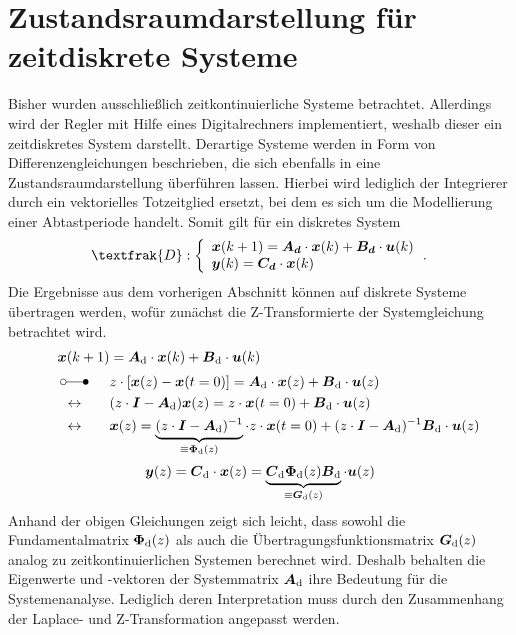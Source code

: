 \section{Zustandsraumdarstellung für zeitdiskrete Systeme}
Bisher wurden ausschließlich zeitkontinuierliche Systeme betrachtet. Allerdings wird der Regler mit Hilfe eines Digitalrechners implementiert, weshalb dieser ein zeitdiskretes System darstellt.  Derartige Systeme werden in Form von Differenzengleichungen beschrieben, die sich ebenfalls in eine Zustandsraumdarstellung überführen lassen. Hierbei wird lediglich der Integrierer durch ein vektorielles Totzeitglied ersetzt, bei dem es sich um die Modellierung einer Abtastperiode handelt.  Somit gilt für ein diskretes System 
\begin{equation}
\textfrak{D} : \left\{ \begin{array}{ll}
\bs{{x}}(k+1) = \bs{A_d}\cdot \bs{x}(k) + \bs{B_d}\cdot \bs{u}(k) \\
\bs{y}(k) = \bs{C_d}\cdot \bs{x}(k)
\end{array}\,.
\right.
\label{eq_discrete_ss}
\end{equation}
Die Ergebnisse aus dem vorherigen Abschnitt können auf diskrete Systeme übertragen werden, wofür zunächst die Z-Transformierte der Systemgleichung betrachtet wird.
\begin{align}
\bs{x}(k+1) &= \bs{A}\idx{d}\cdot \bs{x}(k)+\bs{B}\idx{d}\cdot \bs{u}(k)
\nonumber
\\ \myLaplace  &z\cdot \left[\bs{x}(z)- \bs{x}(t=0)\right] = \bs{A}\idx{d}\cdot \bs{x}(z) + \bs{B}\idx{d}\cdot \bs{u}(z) \nonumber
\\
\hspace{15pt}\leftrightarrow\hspace{20pt}
&(z\cdot\bs{I}-\bs{A}\idx{d})\bs{x}(z) = z\cdot \bs{x}(t=0)+\bs{B}\idx{d}\cdot \bs{u}(z) \nonumber
\\
\hspace{15pt}\leftrightarrow\hspace{20pt}
&\bs{x}(z) = \underbrace{(z\cdot\bs{I}-\bs{A}\idx{d})^{-1}}_{\equiv \bs{\Phi}\idx{d}(z)}\cdot z\cdot \bs{x}(t=0) + (z\cdot \bs{I}-\bs{A}\idx{d})^{-1}\bs{B}\idx{d}\cdot \bs{u}(z)
\end{align}
\begin{equation}
\boldsymbol{y}(z) = \boldsymbol{C}_{\text{d}}\cdot \boldsymbol{x}(z) = \underbrace{\boldsymbol{C}_{\text{d}}\boldsymbol{\Phi}_{\text{d}}(z)\boldsymbol{B}_{\text{d}}}_{\equiv \boldsymbol{G}_{\text{d}}(z)}\cdot \boldsymbol{u}(z)
\end{equation}
Anhand der obigen Gleichungen zeigt sich leicht, dass sowohl die Fundamentalmatrix $\boldsymbol{\Phi}_{\text{d}}(z)$ als auch die Übertragungsfunktionsmatrix $\boldsymbol{G}_{\text{d}}(z)$ analog zu zeitkontinuierlichen Systemen berechnet wird. Deshalb behalten die Eigenwerte und -vektoren der Systemmatrix $\boldsymbol{A}_{\text{d}}$ ihre Bedeutung für die Systemenanalyse. Lediglich deren Interpretation muss durch den Zusammenhang der Laplace- und Z-Transformation angepasst werden.
